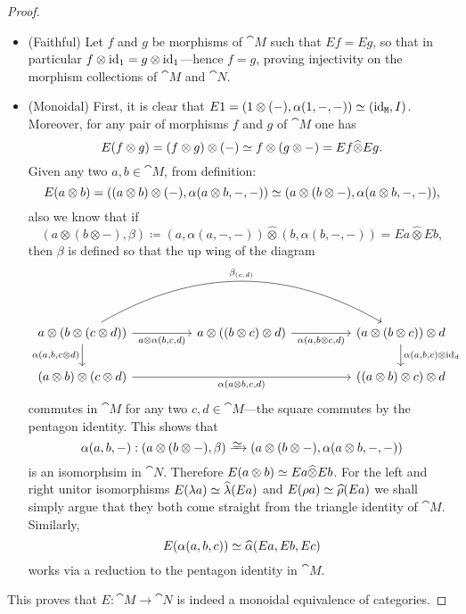 \documentclass[../../deep-dive]{subfiles}
\begin{document}
\begin{proof}
\begin{itemize}
\item (Faithful) Let \(f\) and \(g\) be morphisms of \(\cat M\) such that \(E f
  = E g\), so that in particular \(f \otimes \operatorname{id}_1 = g \otimes \operatorname{id}_1\)---hence
  \(f = g\), proving injectivity on the morphism collections of \(\cat M\) and
  \(\cat N\).

\item (Monoidal) First, it is clear that
  \(E 1 = (1 \otimes (-), \alpha(1, -, -)) \simeq (\operatorname{id}_{\texttt M}, I)\). Moreover,
  for any pair of morphisms \(f\) and \(g\) of \(\cat M\) one has
  \[
  E(f \otimes g) = (f \otimes g) \otimes (-)
  \simeq f \otimes (g \otimes -)
  = E f \widehat\otimes E g.
  \]
  Given any two \(a, b \in \cat M\), from definition:
  \[
  E (a \otimes b) = ((a \otimes b) \otimes (-), \alpha(a \otimes b, -, -))
  \simeq (a \otimes (b \otimes -), \alpha(a \otimes b, -, -)),
  \]
  also we know that if
  \[
  (a \otimes (b \otimes -), \beta)
  \coloneq (a, \alpha(a, -, -)) \widehat\otimes (b, \alpha(b, -, -))
  = E a \widehat\otimes E b,
  \]
  then \(\beta\) is defined so that the up wing of the diagram
  \[
  \begin{tikzcd}
  a \otimes (b \otimes (c \otimes d))
  \ar[rr, "{a \otimes \alpha(b, c, d)}"']
  \ar[rrrr, bend left, "\beta_{(c, d)}"]
  \ar[d, "\alpha{(a, b, c \otimes d)}"']
  &&a \otimes ((b \otimes c) \otimes d)
  \ar[rr, "{\alpha(a, b \otimes c, d)}"']
  &&(a \otimes (b \otimes c)) \otimes d
  \ar[d, "\alpha{(a, b, c)} \otimes \Id_d"]
  \\
  (a \otimes b) \otimes (c \otimes d)
  \ar[rrrr, "\alpha{(a \otimes b, c, d)}"']
  && &&((a \otimes b) \otimes c) \otimes d
  \end{tikzcd}
  \]
  commutes in \(\cat M\) for any two \(c, d \in \cat M\)---the square commutes
  by the pentagon identity. This shows that
  \[
  \alpha(a, b, -): (a \otimes (b \otimes -), \beta)
  \isoto (a \otimes (b \otimes -), \alpha(a \otimes b, -, -))
  \]
  is an isomorphsim in \(\cat N\). Therefore
  \(E(a \otimes b) \simeq E a \widehat \otimes E b\). For the left and right
  unitor isomorphisms \(E (\lambda a) \simeq \widehat \lambda(E a)\) and
  \(E(\rho a) \simeq \widehat \rho(E a)\) we shall simply argue that they both
  come straight from the triangle identity of \(\cat M\). Similarly,
  \[
  E(\alpha(a, b, c)) \simeq \widehat \alpha(E a, E b, E c)
  \]
  works via a reduction to the pentagon identity in \(\cat M\).
\end{itemize}
This proves that \(E: \cat M \to \cat N\) is indeed a monoidal equivalence of
categories.
\end{proof}
\end{document}

